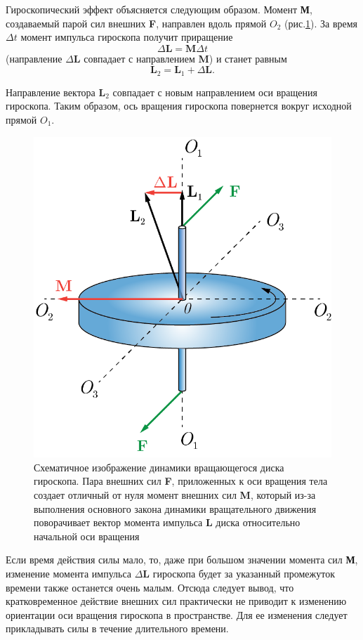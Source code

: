 \documentclass[14pt,a4paper,oneside]{extarticle}	%
\begin{document}
	Гироскопический эффект объясняется следующим образом.
	Момент  \textbf{М}, создаваемый парой сил внешних \textbf{F}, направлен вдоль прямой $ O_2 $ (рис.\ref{gyro-3}). 
	За время $ \Delta t $ момент импульса гироскопа получит приращение $$ \Delta \textbf{L} = \textbf{M} \Delta t $$ (направление $ \Delta \textbf{L} $ совпадает с направлением \textbf{M}) и станет равным $$ \textbf{L}_2=\textbf{L}_1+\Delta \textbf{L}. $$
	
	Направление вектора $ \textbf{L}_2 $ совпадает с новым направлением оси вращения гироскопа.
	Таким образом, ось вращения гироскопа повернется вокруг исходной прямой $ O_1 $.
	
			\begin{figure}[H]
	\centering 	
	\includegraphics[width=0.6\linewidth]{gyro-3.png}
	\caption{Схематичное изображение динамики вращающегося диска гироскопа. Пара внешних сил \textbf{F}, приложенных к оси вращения тела создает отличный от нуля момент внешних сил \textbf{M}, который из-за выполнения основного закона динамики вращательного движения поворачивает вектор момента импульса $ \textbf{L} $ диска относительно начальной оси вращения}
	\label{gyro-3}
\end{figure}
	
	Если время действия силы мало, то, даже при большом значении момента сил \textbf{М}, изменение момента импульса $ \Delta\textbf{L} $ гироскопа будет за указанный промежуток времени также останется очень малым.
	Отсюда следует вывод, что кратковременное действие внешних сил практически не приводит к изменению ориентации оси вращения гироскопа в пространстве.
	Для ее изменения следует прикладывать силы в течение длительного времени.
	
\end{document}
